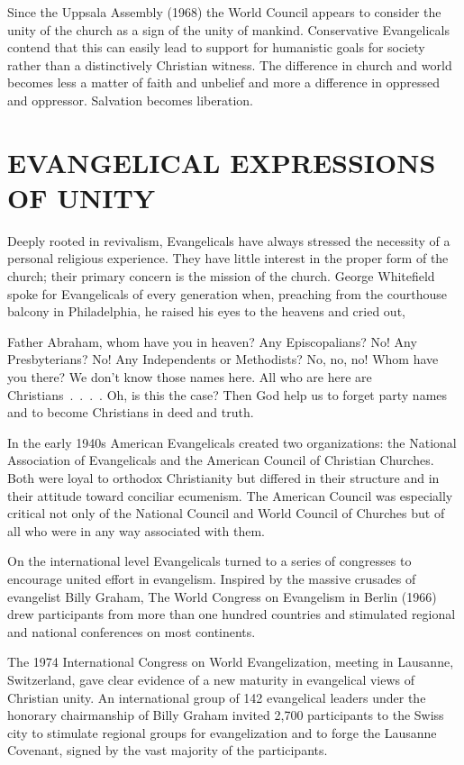Since the Uppsala Assembly (1968) the World Council appears to consider the unity of the church as a
sign of the unity of mankind. Conservative Evangelicals contend that this can easily lead to support
for humanistic goals for society rather than a distinctively Christian witness. The difference in
church and world becomes less a matter of faith and unbelief and more a difference in oppressed and
oppressor. Salvation becomes liberation.

\section{EVANGELICAL EXPRESSIONS OF UNITY}

Deeply rooted in revivalism, Evangelicals have always stressed the necessity of a personal religious
experience. They have little interest in the proper form of the church; their primary concern is the
mission of the church. George Whitefield spoke for Evangelicals of every generation when, preaching
from the courthouse balcony in Philadelphia, he raised his eyes to the heavens and cried out,

\begin{blockquote}
Father Abraham, whom have you in heaven? Any Episcopalians? No! Any Presbyterians? No! Any
Independents or Methodists? No, no, no! Whom have you there? We don’t know those names here. All who
are here are Christians~.~.~.~. Oh, is this the case? Then God help us to forget party names and to
become Christians in deed and truth.
\end{blockquote}

In the early 1940s American Evangelicals created two organizations: the National Association of
Evangelicals and the American Council of Christian Churches. Both were loyal to orthodox
Christianity but differed in their structure and in their attitude toward conciliar ecumenism. The
American Council was especially critical not only of the National Council and World Council of
Churches but of all who were in any way associated with them.

On the international level Evangelicals turned to a series of congresses to encourage united effort
in evangelism. Inspired by the massive crusades of evangelist Billy Graham, The World Congress on
Evangelism in Berlin (1966) drew participants from more than one hundred countries and stimulated
regional and national conferences on most continents.

The 1974 International Congress on World Evangelization, meeting in Lausanne, Switzerland, gave
clear evidence of a new maturity in evangelical views of Christian unity. An international group of
142 evangelical leaders under the honorary chairmanship of Billy Graham invited 2,700 participants
to the Swiss city to stimulate regional groups for evangelization and to forge the Lausanne
Covenant, signed by the vast majority of the participants.

